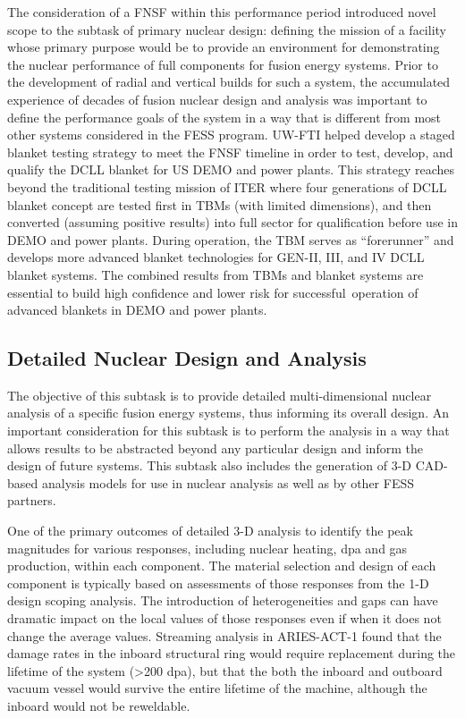 The consideration of a \gls{FNSF} within this performance period introduced
novel scope to the subtask of primary nuclear design: defining the mission of
a facility whose primary purpose would be to provide an environment for
demonstrating the nuclear performance of full components for fusion energy
systems.  Prior to the development of radial and vertical builds for such a
system, the accumulated experience of decades of fusion nuclear design and
analysis was important to define the performance goals of the system in a way
that is different from most other systems considered in the \gls{FESS}
program.  \gls{UW-FTI} helped develop a staged blanket testing strategy to
meet the \gls{FNSF} timeline in order to test, develop, and qualify the
\gls{DCLL} blanket for US DEMO and power plants. This strategy reaches beyond
the traditional testing mission of ITER where four generations of \gls{DCLL}
blanket concept are tested first in \glspl{TBM} (with limited dimensions), and
then converted (assuming positive results) into full sector for qualification
before use in DEMO and power plants. During operation, the \gls{TBM} serves as
“forerunner” and develops more advanced blanket technologies for GEN-II, III,
and IV \gls{DCLL} blanket systems.  The combined results from \glspl{TBM} and
blanket systems are essential to build high confidence and lower risk for
successful operation of advanced blankets in DEMO and power plants.

\subsection{Detailed Nuclear Design and Analysis}

The objective of this subtask is to provide detailed multi-dimensional nuclear
analysis of a specific fusion energy systems, thus informing its overall
design.  An important consideration for this subtask is to perform the
analysis in a way that allows results to be abstracted beyond any particular
design and inform the design of future systems.  This subtask also includes
the generation of 3-D CAD-based analysis models for use in nuclear analysis as
well as by other \gls{FESS} partners.

One of the primary outcomes of detailed 3-D analysis to identify the peak
magnitudes for various responses, including nuclear heating, dpa and gas
production, within each component.  The material selection and design of each
component is typically based on assessments of those responses from the 1-D
design scoping analysis.  The introduction of heterogeneities and gaps can
have dramatic impact on the local values of those responses even if when it
does not change the average values.  Streaming analysis in ARIES-ACT-1 found
that the damage rates in the inboard structural ring would require replacement
during the lifetime of the system (>200 dpa), but that the both the inboard
and outboard vacuum vessel would survive the entire lifetime of the machine,
although the inboard would not be reweldable.


